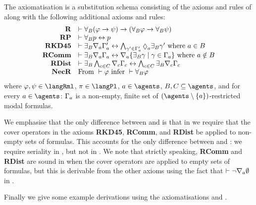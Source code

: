 \begin{definition}
The axiomatisation \axiomRmlKD{} is a substitution schema consisting of the axioms and rules of \axiomKD{} along with the following additional axioms and rules:
$$
\begin{array}{rl}
    {\bf R} & \proves \allrefsBs (\phi \implies \psi) \implies (\allrefsBs \phi \implies \allrefsBs \psi)\\
    {\bf RP} & \proves \allrefsBs \atomP \iff \atomP\\
    {\bf RKD45} & \proves \somerefsBs \coversA \Gamma'_\agentA \iff \bigwedge_{\gamma' \in \Gamma'_\agentA} \possibleA \somerefsBs \gamma' \text{ where } \agentA \in \agentsB\\
    {\bf RComm} & \proves \somerefsBs \coversA \Gamma_\agentA \iff \coversA \{\somerefsBs \gamma \mid \gamma \in \Gamma_\agentA\} \text{ where } \agentA \notin \agentsB\\
    {\bf RDist} & \proves \somerefsBs \bigwedge_{\agentC \in \agentsC} \coversC \Gamma_\agentC \iff \bigwedge_{\agentC \in \agentsC} \somerefsBs \coversC \Gamma_\agentC\\
    {\bf NecR} & \text{From } \proves \phi \text{ infer } \proves \allrefsBs \phi
\end{array}
$$
where $\phi, \psi \in \langRml$, $\pi \in \langPl$, $\agentA \in \agents$, $\agentsB, \agentsC \subseteq \agents$, and for every $\agentA \in \agents$: $\Gamma_a$ is a non-empty, finite set of $(\agents \setminus \{\agentA\})$-restricted modal formulas.
\end{definition}

We emphasise that the only difference between \axiomRmlKFF{} and \axiomRmlKD{} is that in \axiomRmlKD{} we require that the cover operators in the axioms {\bf RKD45}, {\bf RComm}, and {\bf RDist} be applied to non-empty sets of formulas.
This accounts for the only difference between \classKFF{} and \classKD{}: we require seriality in \classKD{}, but not in \classKFF{}.
We note that strictly speaking, {\bf RComm} and {\bf RDist} are sound in \logicRmlKD{} when the cover operators are applied to empty sets of formulas, but this is derivable from the other axioms using the fact that $\vdash \lnot \nabla_{a} \emptyset$ in \axiomKFF{}.

Finally we give some example derivations using the axiomatisations \axiomRmlKFF{} and \axiomRmlKD{}.

